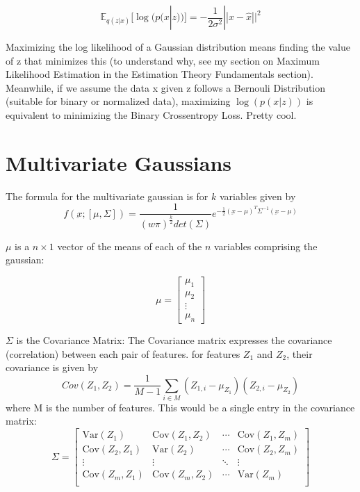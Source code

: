 \documentclass[12pt]{article}
\begin{document}
\[ \mathbb{E}_{q(z|x)}[\log(p(x|z))] = -\frac{1}{2\sigma^2}|| x - \hat{x}||^2\]

Maximizing the log likelihood of a Gaussian distribution means finding the value of z that minimizes this (to understand why, see my section on Maximum Likelihood Estimation in the Estimation Theory Fundamentals section). \\

Meanwhile, if we assume the data x given z follows a Bernouli Distribution (suitable for binary or normalized data), maximizing \(\log(p(x|z))\) is equivalent to minimizing the Binary Crossentropy Loss. Pretty cool.


\section{Multivariate Gaussians}

The formula for the multivariate gaussian is for \(k\) variables given by 
\[f(\underbar{x}; [\mu, \Sigma]) = \frac{1}{(w\pi)^{\frac{k}{2}}det(\Sigma)}e^{-\frac{1}{2}(\underbar{x} - \mu)^T \Sigma^{-1}(\underbar{x} - \mu)}\]

\(\mu\) is a \(n \times 1\) vector of the means of each of the \(n\) variables comprising the gaussian:

\[\mu = \left[ \begin{array}{c} \mu_1 \\ \mu_2 \\ \vdots \\ \mu_n \end{array}\right]\]

\(\Sigma\) is the Covariance Matrix:
The Covariance matrix expresses the covariance (correlation) between each pair of features. for features \(Z_1\) and \(Z_2\), their covariance is given by \[Cov(Z_1,Z_2) = \frac{1}{M-1} \sum_{i \in M} (Z_{1,i} - \mu_{Z_1})(Z_{2,i} - \mu_{Z_2})\]
where M is the number of features. This would be a single entry in the covariance matrix:
\[ \Sigma = 
\left[
\begin{array}{cccc}
\text{Var}(Z_1) & \text{Cov}(Z_1, Z_2) & \cdots & \text{Cov}(Z_1, Z_m) \\
\text{Cov}(Z_2, Z_1) & \text{Var}(Z_2) & \cdots & \text{Cov}(Z_2, Z_m) \\
\vdots & \vdots & \ddots & \vdots \\
\text{Cov}(Z_m, Z_1) & \text{Cov}(Z_m, Z_2) & \cdots & \text{Var}(Z_m) \\
\end{array}
\right]
\]
\end{document}
